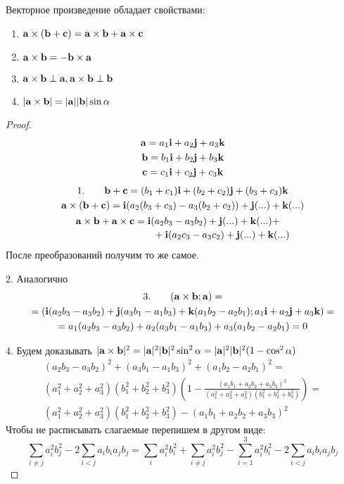 \documentclass[main]{subfiles}
\begin{document}
\begin{theorem}
    Векторное произведение обладает свойствами:
    \begin{enumerate}
        \item $\mathbf{a} \times (\mathbf{b} + \mathbf{c}) = \mathbf{a} \times \mathbf{b} + \mathbf{a} \times \mathbf{c}$
        \item $\mathbf{a} \times \mathbf{b} = -\mathbf{b} \times \mathbf{a}$
        \item $\mathbf{a} \times \mathbf{b} \perp \mathbf{a}, \mathbf{a} \times \mathbf{b} \perp \mathbf{b}$
        \item $|\mathbf{a} \times \mathbf{b}| = |\mathbf{a}||\mathbf{b}|\sin\alpha$
    \end{enumerate}
\end{theorem}
\begin{proof}
    \begin{gather*}
        \mathbf{a} = a_1 \mathbf{i} + a_2 \mathbf{j} + a_3 \mathbf{k}\\
        \mathbf{b} = b_1 \mathbf{i} + b_2 \mathbf{j} + b_3 \mathbf{k}\\
        \mathbf{c} = c_1 \mathbf{i} + c_2 \mathbf{j} + c_3 \mathbf{k}
    \end{gather*}
    \begin{gather*}
        1. \qquad \vb+\vc = (b_1 + c_1) \vi + (b_2+c_2) \vj + (b_3+c_3)\vk\\
        \va \times (\vb+\vc) = \vi (a_2(b_3+c_3) - a_3 (b_2+c_2))+\vj(...)+\vk(...)\\
        \begin{multlined}
            \va \times \vb + \va \times \vc = \vi (a_2 b_3 - a_3 b_2)+\vj(...)+\vk(...)+\\
            +\vi (a_2 c_3 - a_3 c_2)+\vj(...)+\vk(...)
        \end{multlined}
    \end{gather*}
    После преобразований получим то же самое.

    2. Аналогично
    \begin{multline*}
        3. \qquad (\mathbf{a}\times\mathbf{b}; \mathbf{a}) = \\
        = (\mathbf{i} (a_2 b_3 - a_3 b_2)+ \mathbf{j} (a_3 b_1 - a_1 b_3) + \mathbf{k} (a_1 b_2 - a_2 b_1);
        a_1 \mathbf{i} + a_2 \mathbf{j} + a_3 \mathbf{k}) = \\
        =a_1 (a_2 b_3 - a_3 b_2)+ a_2 (a_3 b_1 - a_1 b_3) + a_3 (a_1 b_2 - a_2 b_1) = 0
    \end{multline*}

    4. Будем доказывать
    $|\mathbf{a} \times \mathbf{b}|^2 = |\mathbf{a}|^2 |\mathbf{b}|^2 \sin^2 \alpha = |\mathbf{a}|^2 |\mathbf{b}|^2 (1 - \cos^2 \alpha)$
    \begin{multline*}
        (a_2 b_3 - a_3 b_2)^2+(a_3 b_1 - a_1 b_3)^2+(a_1 b_2 - a_2 b_1)^2 =\\
        (a_1^2 + a_2^2 + a_3^2)(b_1^2 + b_2^2 + b_3^2)\left(1 -
        \frac{(a_1 b_1 + a_2 b_2 + a_3 b_3)^2}{(a_1^2 + a_2^2 + a_3^2)(b_1^2 + b_2^2 + b_3^2)}\right)=\\
        (a_1^2 + a_2^2 + a_3^2)(b_1^2 + b_2^2 + b_3^2) - (a_1 b_1 + a_2 b_2 + a_3 b_3)^2
    \end{multline*}
    Чтобы не расписывать слагаемые перепишем в другом виде:
    \[\sum_{i\neq j} a_i^2 b_j^2 - 2 \sum_{i<j} a_i b_i a_j b_j =
        \sum_i a_i^2 b_i^2 + \sum_{i \neq j} a_i^2 b_j^2
        - \sum_{i=1}^3 a_i^2 b_i^2 - 2 \sum_{i<j} a_i b_i a_j b_j\]
\end{proof}
\end{document}
